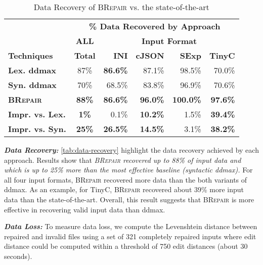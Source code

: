 \documentclass[sigconf,review,anonymous]{acmart}
\newcommand{\recheck}[1]{\textcolor{red}{#1}}
\newcommand{\approach}{\textsc{BRepair}\xspace}
\begin{document}
\begin{table}[!tbp]\centering
\caption{Data Recovery of \approach vs. the state-of-the-art}
\begin{tabular}{|l | c | r  r  r  r |}
\hline
&  \multicolumn{5}{c|}{\textbf{\% Data Recovered by Approach}}  \\
&  \multicolumn{1}{c|}{\textbf{ALL}} & \multicolumn{4}{c|}{\textbf{Input Format}}  \\
\textbf{Techniques} & \textbf{Total} & \textbf{INI} & \textbf{cJSON} & \textbf{SExp} & \textbf{TinyC} \\
\hline
\textbf{Lex. ddmax} & 87\% & \textbf{86.6\%} & 87.1\%	 & 98.5\%	& 70.0\% \\			
\textbf{Syn. ddmax} & 70\% & 68.5\% & 83.8\%  & 96.9\%	& 70.6\% \\	
\hline 
\textbf{\approach} & \textbf{ 88\%} & \textbf{86.6\%} & \textbf{96.0\%} & \textbf{100.0\%}	& \textbf{97.6\%} \\
\hline
\textbf{Impr. vs. Lex.} & \textbf{1\%} & 0.1\%	& \textbf{10.2\%}	& 1.5\%	& \textbf{39.4\%} \\
\textbf{Impr. vs. Syn.} & \textbf{25\%} & \textbf{26.5\%} 	& \textbf{14.5\%}	& 3.1\%	& \textbf{38.2\% }\\
\hline
\end{tabular}
\label{tab:data-recovery}
\end{table}

\noindent
\textbf{\textit{Data Recovery:}} \autoref{tab:data-recovery} %
highlight the data %
recovery achieved by each approach. %
Results show that \textit{\approach recovered up to 88\% of input data and which is up to 25\% more than the most effective baseline (syntactic ddmax).} %
For all four input formats, \approach recovered more data than the both variants of ddmax. As an example, for TinyC, \approach recovered about 39\% more input data than the state-of-the-art. 
Overall, this result suggests that \approach is more effective in recovering valid input data than ddmax. 

\noindent
\textbf{\textit{Data Loss:}} To measure data loss, we compute the Levenshtein distance between repaired and invalid files using %
a set of 321 completely repaired inputs %
where edit distance could be computed within a threshold of 750 edit distances (about 30 seconds). 
\end{document}
